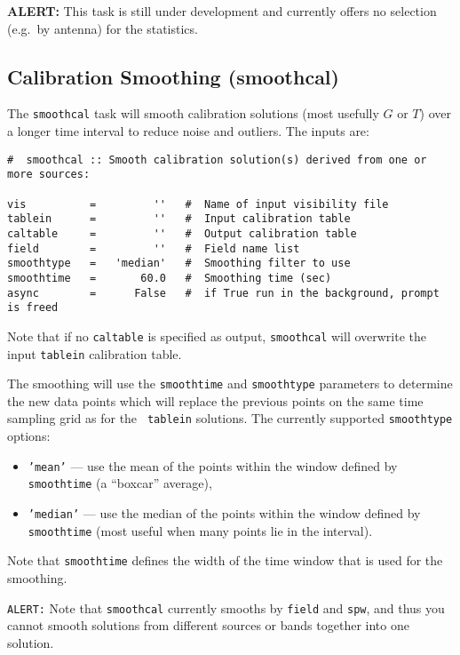 {\bf ALERT:} This task is still under development and currently offers no
selection (e.g.\ by antenna) for the statistics.

\subsection{Calibration Smoothing ({\rm smoothcal})}
\label{section:cal.tables.smooth}

The {\tt smoothcal} task will smooth calibration solutions 
(most usefully $G$ or $T$) over a longer time interval to reduce noise
and outliers.  The inputs are:
\small
\begin{verbatim}
#  smoothcal :: Smooth calibration solution(s) derived from one or more sources:

vis          =         ''   #  Name of input visibility file
tablein      =         ''   #  Input calibration table
caltable     =         ''   #  Output calibration table
field        =         ''   #  Field name list
smoothtype   =   'median'   #  Smoothing filter to use
smoothtime   =       60.0   #  Smoothing time (sec)
async        =      False   #  if True run in the background, prompt is freed
\end{verbatim}
\normalsize

Note that if no {\tt caltable} is specified as output, {\tt smoothcal}
will overwrite the input {\tt tablein} calibration table. 

The smoothing will use the {\tt smoothtime} and {\tt smoothtype}
parameters to determine the new data points which will replace the
previous points on the same time sampling grid as for the {\tt
tablein} solutions.  The currently supported {\tt smoothtype} 
options: 
\begin{itemize}
\item {\tt 'mean'} --- use the mean of the points within the window
defined by {\tt smoothtime} (a ``boxcar'' average),

\item {\tt 'median'} --- use the median of the points within the window
defined by {\tt smoothtime} (most useful when many points lie in the
interval).
\end{itemize}
Note that {\tt smoothtime} defines the width of the time window that
is used for the smoothing.

{\tt ALERT:} Note that {\tt smoothcal} currently smooths by
{\tt field} and {\tt spw}, and thus you cannot smooth solutions
from different sources or bands together into one solution.

